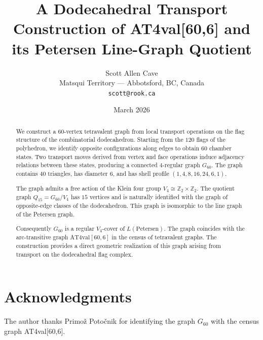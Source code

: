 \documentclass[11pt]{article}
\title{
A Dodecahedral Transport Construction of
AT4val[60,6] and its Petersen Line-Graph Quotient
}
\author{
Scott Allen Cave \\
Matsqui Territory --- Abbotsford, BC, Canada \\
\texttt{scott@rook.ca}
}
\date{March 2026}
\begin{document}
\maketitle

\begin{abstract}

We construct a $60$-vertex tetravalent graph from local transport
operations on the flag structure of the combinatorial dodecahedron.
Starting from the $120$ flags of the polyhedron, we identify opposite
configurations along edges to obtain $60$ chamber states. Two transport
moves derived from vertex and face operations induce adjacency
relations between these states, producing a connected $4$-regular graph
$G_{60}$. The graph contains $40$ triangles, has diameter $6$, and has
shell profile $(1,4,8,16,24,6,1)$.

The graph admits a free action of the Klein four group
$V_4 \cong \mathbb{Z}_2 \times \mathbb{Z}_2$. The quotient graph
$Q_{15}=G_{60}/V_4$ has $15$ vertices and is naturally identified with
the graph of opposite-edge classes of the dodecahedron. This graph is
isomorphic to the line graph of the Petersen graph.

Consequently $G_{60}$ is a regular $V_4$-cover of
$L(\mathrm{Petersen})$. The graph coincides with the arc-transitive
graph $\mathrm{AT4val}[60,6]$ in the census of tetravalent graphs.
The construction provides a direct geometric realization of this graph
arising from transport on the dodecahedral flag complex.

\end{abstract}













\section*{Acknowledgments}

The author thanks Primož Potočnik for identifying the graph
$G_{60}$ with the census graph AT4val[60,6].

\appendix






\end{document}
